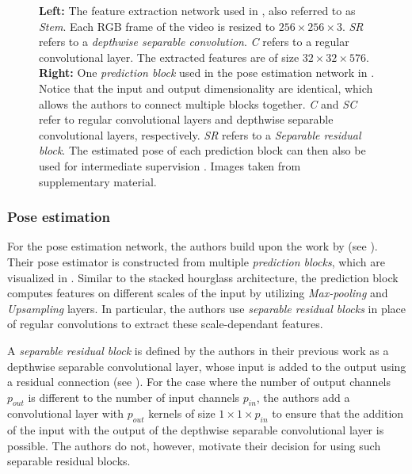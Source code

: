 \begin{figure}[htb!]
    \centering
    \hfill
    \caption{\textbf{Left:} The feature extraction network used in \cite{luvizon_2d/3d_2018}, also referred to as \textit{Stem}. Each RGB frame of the video is resized to $256 \times 256 \times 3$. \textit{SR} refers to a \textit{depthwise separable convolution}. \textit{C} refers to a regular convolutional layer. The extracted features are of size $32 \times 32 \times 576$. 
    \textbf{Right:} One \textit{prediction block} used in the pose estimation network in \cite{luvizon_2d/3d_2018}. Notice that the input and output dimensionality are identical, which allows the authors to connect multiple blocks together. \textit{C} and \textit{SC} refer to regular convolutional layers and depthwise separable convolutional layers, respectively. \textit{SR} refers to a \textit{Separable residual block}. The estimated pose of each prediction block can then also be used for intermediate supervision . Images taken from \cite{luvizon_2d/3d_2018} supplementary material.}
\end{figure}

\subsubsection{Pose estimation}
\label{sec:luvizon_poseestimator}
For the pose estimation network, the authors build upon the work by \cite{newell_stacked_2016} (see ).
Their pose estimator is constructed from multiple \textit{prediction blocks}, which are visualized in .
Similar to the stacked hourglass architecture, the prediction block computes features on different scales of the input by utilizing \textit{Max-pooling} and \textit{Upsampling} layers.
In particular, the authors use \textit{separable residual blocks} in place of regular convolutions to extract these scale-dependant features.

A \textit{separable residual block} is defined by the authors in their previous work \cite{luvizon_human_2017} as a depthwise separable convolutional layer, whose input is added to the output using a residual connection (see ).
For the case where the number of output channels $p_{out}$ is different to the number of input channels $p_{in}$, the authors add a convolutional layer with $p_{out}$ kernels of size $1 \times 1 \times p_{in}$ to ensure that the addition of the input with the output of the depthwise separable convolutional layer is possible.
The authors do not, however, motivate their decision for using such separable residual blocks.

